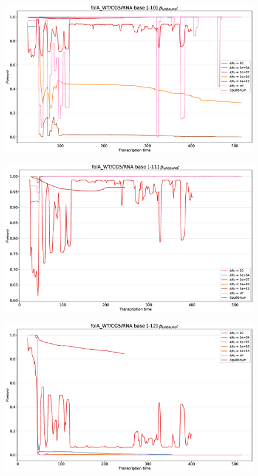 \documentclass[11pt, a4paper]{article}
\begin{document}
\begin{figure}
\centering
\includegraphics[width=\linewidth]{p_unbound/RNA_p_unbound_base[-10]_k_tuning}
\caption{}
\label{fig:RNA_p_unbound_base[-10]_k_tuning}
\end{figure}
\begin{figure}
\centering
\includegraphics[width=\linewidth]{p_unbound/RNA_p_unbound_base[-11]_k_tuning}
\caption{}
\label{fig:RNA_p_unbound_base[-11]_k_tuning}
\end{figure}
\begin{figure}
\centering
\includegraphics[width=\linewidth]{p_unbound/RNA_p_unbound_base[-12]_k_tuning}
\caption{}
\label{fig:RNA_p_unbound_base[-12]_k_tuning}
\end{figure}
\end{document}
